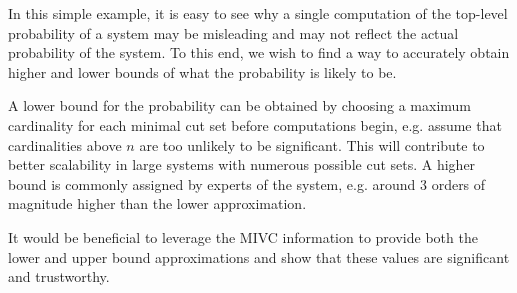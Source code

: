 In this simple example, it is easy to see why a single computation of the top-level probability of a system may be misleading and may not reflect the actual probability of the system. To this end, we wish to find a way to accurately obtain higher and lower bounds of what the probability is likely to be. 

A lower bound for the probability can be obtained by choosing a maximum cardinality for each minimal cut set before computations begin, e.g. assume that cardinalities above $n$ are too unlikely to be significant. This will contribute to better scalability in large systems with numerous possible cut sets. A higher bound is commonly assigned by experts of the system, e.g. around 3 orders of magnitude higher than the lower approximation. 

It would be beneficial to leverage the  MIVC information to provide both the lower and upper bound approximations and show that these values are significant and trustworthy. 




